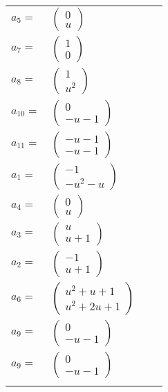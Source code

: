 \documentclass[1p]{elsarticle_modified}
\theoremstyle{definition}
\begin{document}
\begin{tabular}{m{7pt} m{180pt} m{7pt} m{180pt} }
\flushright $a_{5}=$&$\begin{pmatrix}0\\u\end{pmatrix}$ \\
\flushright $a_{7}=$&$\begin{pmatrix}1\\0\end{pmatrix}$ \\
\flushright $a_{8}=$&$\begin{pmatrix}1\\u^2\end{pmatrix}$ \\
\flushright $a_{10}=$&$\begin{pmatrix}0\\- u-1\end{pmatrix}$ \\
\flushright $a_{11}=$&$\begin{pmatrix}- u-1\\- u-1\end{pmatrix}$ \\
\flushright $a_{1}=$&$\begin{pmatrix}-1\\- u^2- u\end{pmatrix}$ \\
\flushright $a_{4}=$&$\begin{pmatrix}0\\u\end{pmatrix}$ \\
\flushright $a_{3}=$&$\begin{pmatrix}u\\u+1\end{pmatrix}$ \\
\flushright $a_{2}=$&$\begin{pmatrix}-1\\u+1\end{pmatrix}$ \\
\flushright $a_{6}=$&$\begin{pmatrix}u^2+u+1\\u^2+2 u+1\end{pmatrix}$ \\
\flushright $a_{9}=$&$\begin{pmatrix}0\\- u-1\end{pmatrix}$\\ \flushright $a_{9}=$&$\begin{pmatrix}0\\- u-1\end{pmatrix}$\\&\end{tabular}
\end{document}
